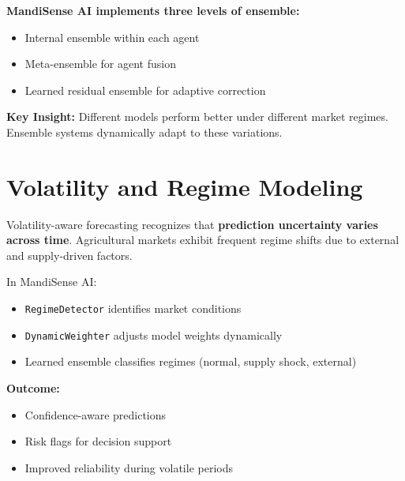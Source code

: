 \documentclass[12pt,a4paper]{report}
\begin{document}
\vspace{0.4em}

\noindent
\textbf{MandiSense AI implements three levels of ensemble:}
\begin{itemize}
    \item Internal ensemble within each agent
    \item Meta-ensemble for agent fusion
    \item Learned residual ensemble for adaptive correction
\end{itemize}

\vspace{0.4em}

\noindent
\textbf{Key Insight:}  
Different models perform better under different market regimes. Ensemble systems dynamically adapt to these variations.

\vspace{0.7em}


\section{Volatility and Regime Modeling}

\noindent
Volatility-aware forecasting recognizes that \textbf{prediction uncertainty varies across time}. Agricultural markets exhibit frequent regime shifts due to external and supply-driven factors.

\vspace{0.4em}

\noindent
In MandiSense AI:
\begin{itemize}
    \item \texttt{RegimeDetector} identifies market conditions
    \item \texttt{DynamicWeighter} adjusts model weights dynamically
    \item Learned ensemble classifies regimes (normal, supply shock, external)
\end{itemize}

\vspace{0.4em}

\noindent
\textbf{Outcome:}
\begin{itemize}
    \item Confidence-aware predictions
    \item Risk flags for decision support
    \item Improved reliability during volatile periods
\end{itemize}
\end{document}
